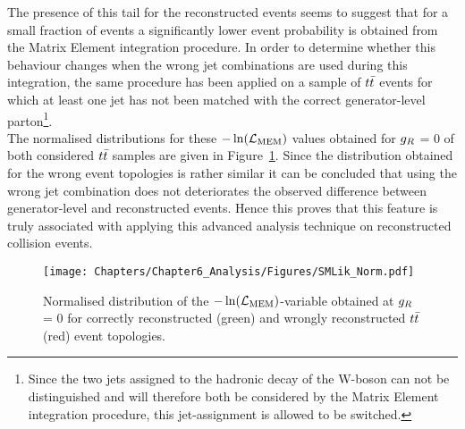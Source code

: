 The presence of this tail for the reconstructed events seems to suggest that for a small fraction of events a significantly lower event probability is obtained from the Matrix Element integration procedure.
In order to determine whether this behaviour changes when the wrong jet combinations are used during this integration, the same procedure has been applied on a sample of $t\bar{t}$ events for which at least one jet has not been matched with the correct generator-level parton\footnote{Since the two jets assigned to the hadronic decay of the W-boson can not be distinguished and will therefore both be considered by the Matrix Element integration procedure, this jet-assignment is allowed to be switched.}. 
\\
The normalised distributions for these $-\ln(\mathcal{L}_{\textrm{MEM}})$ values obtained for $g_{R}$ = 0 of both considered $t\bar{t}$ samples are given in Figure~\ref{fig::SMLikCorrVSWr}.
Since the distribution obtained for the wrong event topologies is rather similar it can be concluded that using the wrong jet combination does not deteriorates the observed difference between generator-level and reconstructed events. 
Hence this proves that this feature is truly associated with applying this advanced analysis technique on reconstructed collision events.
\begin{figure}[h!t]
 \centering
 \texttt{[image: Chapters/Chapter6\_Analysis/Figures/SMLik\_Norm.pdf]}
 \caption{Normalised distribution of the $-\ln(\mathcal{L}_{\textrm{MEM}})$-variable obtained at $g_{R}$ = 0 for correctly reconstructed (green) and wrongly reconstructed $t\bar{t}$ (red) event topologies.} \label{fig::SMLikCorrVSWr}
\end{figure}

